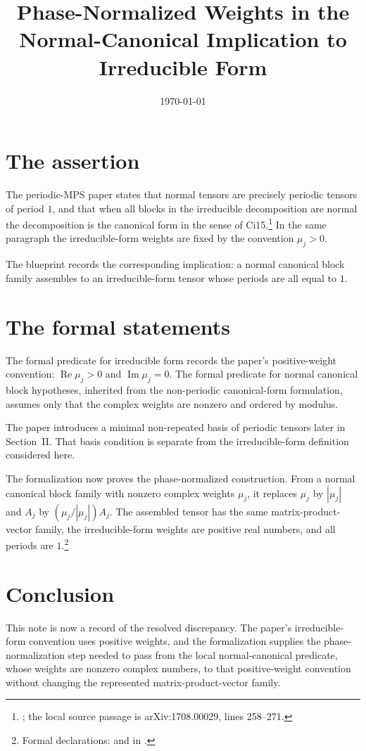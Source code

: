 \documentclass[11pt]{article}
\title{Phase-Normalized Weights in the Normal-Canonical Implication to Irreducible Form}
\author{}
\date{\today}
\begin{document}
\maketitle

\section{The assertion}

The periodic-MPS paper states that normal tensors are precisely periodic
tensors of period \(1\), and that when all blocks in the irreducible
decomposition are normal the decomposition is the canonical form in the sense of
Ci15.\footnote{\cite[Section~II]{DeLasCuevas2017Irreducible}; the local source
passage is arXiv:1708.00029, lines 258--271.}
In the same paragraph the irreducible-form weights are fixed by the convention
\(\mu_j>0\).

The blueprint records the corresponding implication: a normal canonical block family
assembles to an irreducible-form tensor whose periods are all equal to \(1\).

\section{The formal statements}

The formal predicate for irreducible form records the paper's positive-weight
convention: \(\operatorname{Re}\mu_j>0\) and \(\operatorname{Im}\mu_j=0\).
The formal predicate for normal canonical block hypotheses, inherited from the
non-periodic canonical-form formulation, assumes only that the complex weights
are nonzero and ordered by modulus.

The paper introduces a minimal non-repeated basis of periodic tensors later in
Section~II. That basis condition is separate from the irreducible-form
definition considered here.

The formalization now proves the phase-normalized construction.  From a normal
canonical block family with nonzero complex weights \(\mu_j\), it replaces
\(\mu_j\) by \(|\mu_j|\) and \(A_j\) by \((\mu_j/|\mu_j|)A_j\).  The assembled
tensor has the same matrix-product-vector family, the irreducible-form weights
are positive real numbers, and all periods are \(1\).\footnote{Formal
declarations:
 and
 in
.}

\section{Conclusion}

This note is now a record of the resolved discrepancy.  The paper's
irreducible-form convention uses positive weights, and the formalization
supplies the phase-normalization step needed to pass from the local
normal-canonical predicate, whose weights are nonzero complex numbers, to that
positive-weight convention without changing the represented
matrix-product-vector family.



\end{document}
